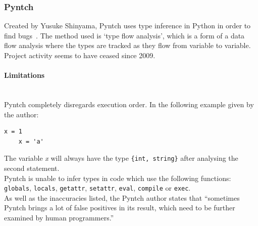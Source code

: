 \documentclass[12pt, titlepage]{article}
\begin{document}
\subsubsection{Pyntch}
Created by Yusuke Shinyama, Pyntch uses type inference in Python in order to find bugs~\cite{pyntch}. The method used is `type flow analysis', which is a form of a data flow analysis where the types are tracked as they flow from variable to variable. Project activity seems to have ceased since 2009.
\paragraph{Limitations}\mbox{}\\
Pyntch completely disregards execution order. In the following example given by the author:
\begin{lstlisting}[mathescape]
	x = 1
	x = 'a'
\end{lstlisting}
The variable \textit{x} will always have the type \texttt{\{int, string\}} after analysing the second statement. \\
\indent Pyntch is unable to infer types in code which use the following functions: \texttt{globals},  \texttt{locals},  \texttt{getattr},  \texttt{setattr},  \texttt{eval},  \texttt{compile} or  \texttt{exec}. \\
\indent As well as the inaccuracies listed, the Pyntch author states that ``sometimes Pyntch brings a lot of false positives in its result, which need to be further examined by human programmers.''

\end{document}
